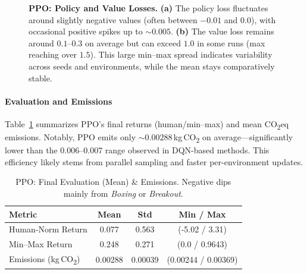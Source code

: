 \begin{figure} 
	\centering
	\quad
	\caption{\textbf{PPO: Policy and Value Losses.}
		\textbf{(a)} The policy loss fluctuates around slightly negative values 
		(often between $-0.01$ and $0.0$), with occasional positive spikes up to $\sim0.005$. 
		\textbf{(b)} The value loss remains around $0.1$--$0.3$ on average but can exceed $1.0$ in some runs 
		(max reaching over $1.5$). This large min--max spread indicates variability across seeds and environments, 
		while the mean stays comparatively stable.}
	\label{fig:ppo_pol_val_losses}
\end{figure}

\paragraph{Evaluation and Emissions}
Table~\ref{tab:ppo_eval} summarizes PPO's final returns (human/min--max) and mean CO\textsubscript{2}eq emissions. 
Notably, PPO emits only $\sim0.00288$\,kg\,CO\textsubscript{2} on average—significantly lower than the 0.006--0.007 range observed in DQN-based methods. This efficiency likely stems from parallel sampling and faster per-environment updates.

\begin{table} 
	\caption{PPO: Final Evaluation (Mean) \& Emissions. Negative dips mainly from \emph{Boxing} or \emph{Breakout}.}
	\label{tab:ppo_eval}
	\centering
	\begin{tabular}{lccc}
		\toprule
		\textbf{Metric} & \textbf{Mean} & \textbf{Std} & \textbf{Min / Max}\\
		\midrule
		Human‐Norm Return & 0.077 & 0.563 & (-5.02 / 3.31)\\
		Min--Max Return   & 0.248 & 0.271 & (0.0 / 0.9643)\\
		Emissions (kg\,CO\textsubscript{2}) & 0.00288 & 0.00039 & (0.00244 / 0.00369)\\
		\bottomrule
	\end{tabular}
\end{table}

